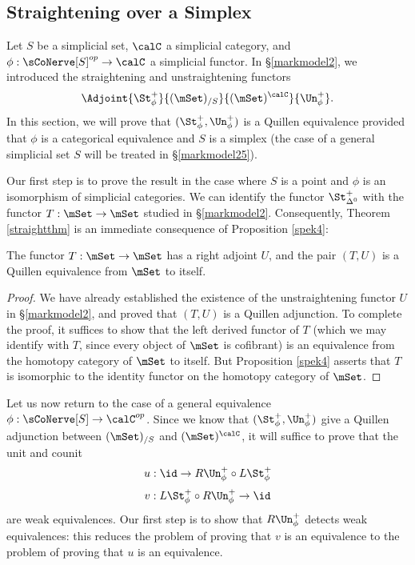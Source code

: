 \subsection{Straightening over a Simplex}\label{markmodel24}

Let $S$ be a simplicial set, $\calC$ a simplicial category, and $\phi: \sCoNerve[S]^{op} \rightarrow \calC$ a simplicial functor. In \S \ref{markmodel2}, we introduced the straightening and unstraightening functors
$$ \Adjoint{ \St^{+}_{\phi} }{ (\mSet)_{/S}}{(\mSet)^{\calC}}{ \Un^{+}_{\phi}}.$$
In this section, we will prove that $( \St^{+}_{\phi}, \Un^{+}_{\phi} )$ is a Quillen equivalence provided that $\phi$ is a categorical equivalence and $S$ is a simplex (the case of a general simplicial set $S$ will be treated in \S \ref{markmodel25}). 

Our first step is to prove the result in the case where $S$ is a point and $\phi$ is an isomorphism
of simplicial categories. We can identify the functor $\St^{+}_{\Delta^0}$ with the functor
$T: \mSet \rightarrow \mSet$ studied in \S \ref{markmodel2}. Consequently, Theorem \ref{straightthm} is an immediate consequence of Proposition \ref{spek4}:

\begin{lemma}\label{utest}
The functor $T: \mSet \rightarrow \mSet$ has a right adjoint $U$, and the pair
$(T,U)$ is a Quillen equivalence from $\mSet$ to itself.
\end{lemma}

\begin{proof}
We have already established the existence of the unstraightening functor $U$ in
\S \ref{markmodel2}, and proved that $(T,U)$ is a Quillen adjunction. To complete the proof,
it suffices to show that the left derived functor of $T$ (which we may identify with $T$, since
every object of $\mSet$ is cofibrant) is an equivalence from the homotopy category
of $\mSet$ to itself. But Proposition \ref{spek4} asserts that $T$ is isomorphic to the identity functor on the homotopy category of $\mSet$.
\end{proof}

Let us now return to the case of a general equivalence $\phi: \sCoNerve[S] \rightarrow \calC^{op}$.
Since we know that $(\St^{+}_{\phi}, \Un^{+}_{\phi})$ give a Quillen adjunction between $(\mSet)_{/S}$ and
$(\mSet)^{\calC}$, it will suffice to prove that the unit and counit
$$ u: \id \rightarrow R \Un^{+}_{\phi} \circ L \St^{+}_{\phi}$$
$$ v: L \St^{+}_{\phi} \circ R \Un^{+}_{\phi} \rightarrow \id$$
are weak equivalences. Our first step is to show that $R \Un^{+}_{\phi}$ detects weak equivalences: this reduces the problem of proving that $v$ is an equivalence to the problem of proving that $u$ is an equivalence. 

